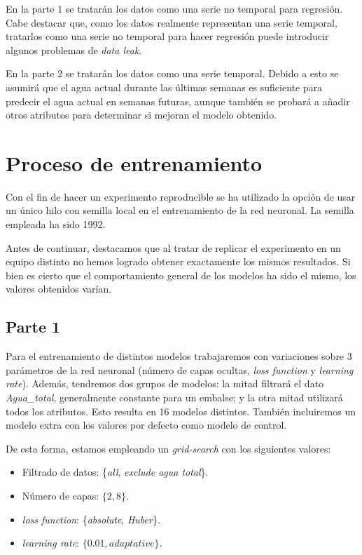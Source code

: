 \documentclass[12pt]{report} %
\begin{document}
    En la parte 1 se tratarán los datos como una serie no temporal para regresión.
    Cabe destacar que, como los datos realmente representan una serie temporal,
    tratarlos como una serie no temporal para hacer regresión puede introducir
    algunos problemas de \textit{data leak}.

    En la parte 2 se tratarán los datos como una serie temporal. Debido a esto
    se asumirá que el agua actual durante las últimas semanas es suficiente para
    predecir el agua actual en semanas futuras, aunque también se probará a añadir
    otros atributos para determinar si mejoran el modelo obtenido.

\chapter{Proceso de entrenamiento}
\label{chap:train}
    Con el fin de hacer un experimento reproducible se ha utilizado la opción de usar un único hilo con semilla local en el entrenamiento de la red neuronal. La semilla empleada ha sido 1992.

    Antes de continuar, destacamos que al tratar de replicar el experimento en un equipo distinto no hemos logrado obtener exactamente los mismos resultados. Si bien es cierto que el comportamiento general de los modelos ha sido el mismo, los valores obtenidos varían.
	\section{Parte 1}

        Para el entrenamiento de distintos modelos trabajaremos con variaciones sobre 3 parámetros de la red neuronal (número de capas ocultas, \textit{loss function} y \textit{learning rate}). Además, tendremos dos grupos de modelos: la mitad filtrará el dato \textit{Agua\_total}, generalmente constante para un embalse; y la otra mitad utilizará todos los atributos. Esto resulta en 16 modelos distintos. También incluiremos un modelo extra con los valores por defecto como modelo de control.

        De esta forma, estamos empleando un \textit{grid-search} con los siguientes valores:
        \begin{itemize}
            \item Filtrado de datos: \{\textit{all}, \textit{exclude agua total}\}.
            \item Número de capas: $\{2, 8\}$.
            \item \textit{loss function}: \{\textit{absolute}, \textit{Huber}\}.
            \item \textit{learning rate}: $\{0.01, \textit{adaptative}\}$.
        \end{itemize}
\end{document}

